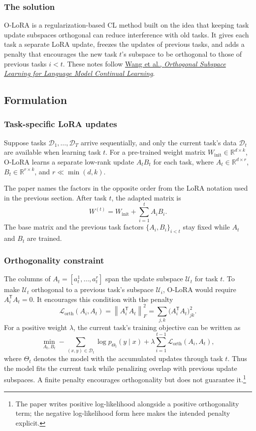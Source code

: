 \subsubsection{The solution}
O-LoRA is a regularization-based CL method built on the idea that keeping task update subspaces orthogonal can reduce interference with old tasks. It gives each task a separate LoRA update, freezes the updates of previous tasks, and adds a penalty that encourages the new task $t$'s subspace to be orthogonal to those of previous tasks $i<t$. These notes follow \href{https://arxiv.org/abs/2310.14152}{Wang et al., \emph{Orthogonal Subspace Learning for Language Model Continual Learning}}.

\subsection{Formulation}

\subsubsection{Task-specific LoRA updates}

Suppose tasks $\mathcal{D}_1,\ldots,\mathcal{D}_T$ arrive sequentially, and only the current task's data $\mathcal{D}_t$ are available when learning task $t$. For a pre-trained weight matrix $W_{\mathrm{init}}\in\mathbb{R}^{d\times k}$, O-LoRA learns a separate low-rank update $A_tB_t$ for each task, where $A_t\in\mathbb{R}^{d\times r}$, $B_t\in\mathbb{R}^{r\times k}$, and $r\ll\min(d,k)$.

The paper names the factors in the opposite order from the LoRA notation used in the previous section. After task $t$, the adapted matrix is
\[
W^{(t)}=W_{\mathrm{init}}+\sum_{i=1}^{t}A_iB_i.
\]
The base matrix and the previous task factors $\{A_i,B_i\}_{i<t}$ stay fixed while $A_t$ and $B_t$ are trained.

\subsubsection{Orthogonality constraint}

The columns of $A_t=[a_t^1,\ldots,a_t^r]$ span the update subspace $\mathcal{U}_t$ for task $t$. To make $\mathcal{U}_t$ orthogonal to a previous task's subspace $\mathcal{U}_i$, O-LoRA would require $A_i^{\mathsf T}A_t=0$. It encourages this condition with the penalty
\[
\mathcal{L}_{\mathrm{orth}}(A_i,A_t)
=\left\|A_i^{\mathsf T}A_t\right\|_F^2
=\sum_{j,k}\bigl(A_i^{\mathsf T}A_t\bigr)_{jk}^{2}.
\]
For a positive weight $\lambda$, the current task's training objective can be written as
\[
\min_{A_t,B_t}
-\sum_{(x,y)\in\mathcal{D}_t}\log p_{\Theta_t}(y\mid x)
+\lambda\sum_{i=1}^{t-1}\mathcal{L}_{\mathrm{orth}}(A_i,A_t),
\]
where $\Theta_t$ denotes the model with the accumulated updates through task $t$. Thus the model fits the current task while penalizing overlap with previous update subspaces. A finite penalty encourages orthogonality but does not guarantee it.\footnote{The paper writes positive log-likelihood alongside a positive orthogonality term; the negative log-likelihood form here makes the intended penalty explicit.}

